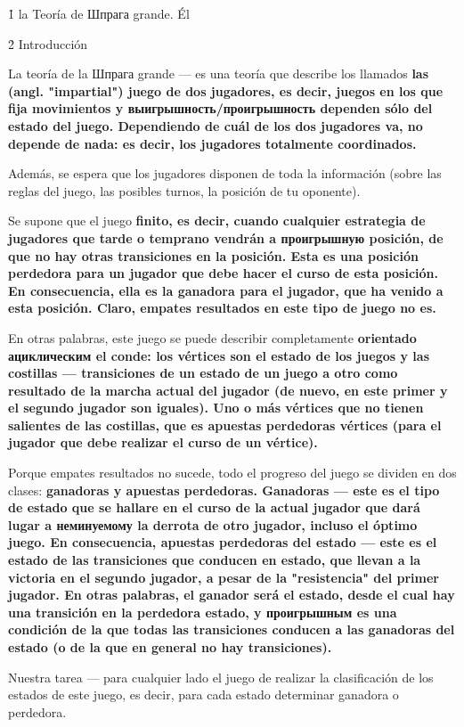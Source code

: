 \h1{ la Teoría de Шпрага grande. Él }


\h2{ Introducción }

La teoría de la Шпрага grande --- es una teoría que describe los llamados \bf{las} (angl. "impartial") juego de dos jugadores, es decir, juegos en los que fija movimientos y выигрышность/проигрышность dependen sólo del estado del juego. Dependiendo de cuál de los dos jugadores va, no depende de nada: es decir, los jugadores totalmente coordinados.

Además, se espera que los jugadores disponen de toda la información (sobre las reglas del juego, las posibles turnos, la posición de tu oponente).

Se supone que el juego \bf{finito}, es decir, cuando cualquier estrategia de jugadores que tarde o temprano vendrán a \bf{проигрышную} posición, de que no hay otras transiciones en la posición. Esta es una posición perdedora para un jugador que debe hacer el curso de esta posición. En consecuencia, ella es la ganadora para el jugador, que ha venido a esta posición. Claro, empates resultados en este tipo de juego no es.

En otras palabras, este juego se puede describir completamente \bf{orientado ациклическим el conde}: los vértices son el estado de los juegos y las costillas --- transiciones de un estado de un juego a otro como resultado de la marcha actual del jugador (de nuevo, en este primer y el segundo jugador son iguales). Uno o más vértices que no tienen salientes de las costillas, que es apuestas perdedoras vértices (para el jugador que debe realizar el curso de un vértice).

Porque empates resultados no sucede, todo el progreso del juego se dividen en dos clases: \bf{ganadoras y apuestas perdedoras}. Ganadoras --- este es el tipo de estado que se hallare en el curso de la actual jugador que dará lugar a неминуемому la derrota de otro jugador, incluso el óptimo juego. En consecuencia, apuestas perdedoras del estado --- este es el estado de las transiciones que conducen en estado, que llevan a la victoria en el segundo jugador, a pesar de la "resistencia" del primer jugador. En otras palabras, el ganador será el estado, desde el cual hay una transición en la perdedora estado, y проигрышным es una condición de la que todas las transiciones conducen a las ganadoras del estado (o de la que en general no hay transiciones).

Nuestra tarea --- para cualquier lado el juego de realizar la clasificación de los estados de este juego, es decir, para cada estado determinar ganadora o perdedora.


